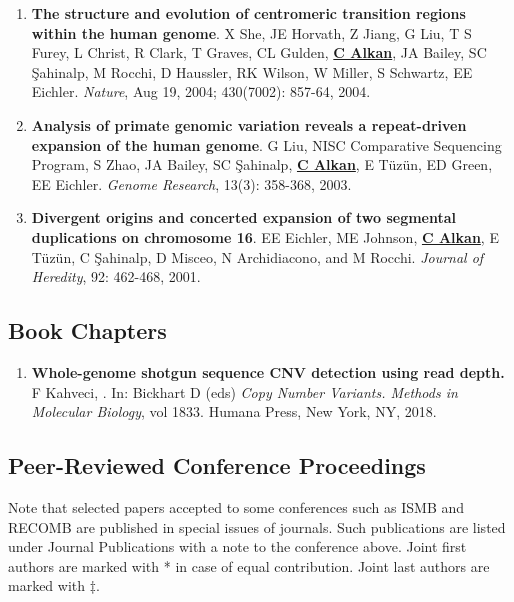 \begin{enumerate}
\item
  {\bf The structure and evolution of centromeric transition regions within
    the human genome}.
  X She, JE Horvath, Z Jiang, G Liu, T S Furey,
  L Christ, R Clark, T Graves, CL Gulden, {\bf \underline{C Alkan}}, JA Bailey, SC \c{S}ahinalp, 
  M Rocchi, D Haussler, RK Wilson, W Miller, S Schwartz, EE Eichler.
  {\em Nature}, Aug 19, 2004;  430(7002): 857-64, 2004.


\item
  {\bf Analysis of primate genomic variation reveals a repeat-driven 
    expansion of the human genome}.
  G Liu, NISC Comparative Sequencing Program, S Zhao, JA Bailey, 
  SC \c{S}ahinalp, {\bf \underline{C Alkan}}, E T\"{u}z\"{u}n, ED Green, EE Eichler.
  {\em Genome Research}, 13(3): 358-368, 2003.

\item
  {\bf Divergent origins and concerted expansion of two segmental
    duplications on 
    chromosome 16}.
  EE Eichler, ME Johnson, {\bf \underline{C Alkan}}, E T\"{u}z\"{u}n, C \c{S}ahinalp,
    D Misceo, 
    N Archidiacono, and M Rocchi.
    {\em Journal of Heredity}, 92: 462-468, 2001.

\end{enumerate}


\vspace{-.4cm}
\subsection{\small \sc  Book Chapters}
\begin{enumerate}
    \item 
       {\bf Whole-genome shotgun sequence CNV detection using read depth.}
       F Kahveci, \calkan{}.
       In: Bickhart D (eds) {\em Copy Number Variants. Methods in Molecular Biology}, vol 1833. Humana Press, New York, NY, 2018.
\end{enumerate}

\vspace{-.4cm}
\subsection{\small \sc  Peer-Reviewed Conference Proceedings}
\vspace{-.4cm}
       {\small
Note that selected papers accepted to some conferences such as ISMB and RECOMB are published
in special issues of journals. Such publications are listed under Journal Publications with a note to the conference above.
Joint first authors are marked with * in case of equal contribution.
Joint last authors are marked with $\ddag$.
}



